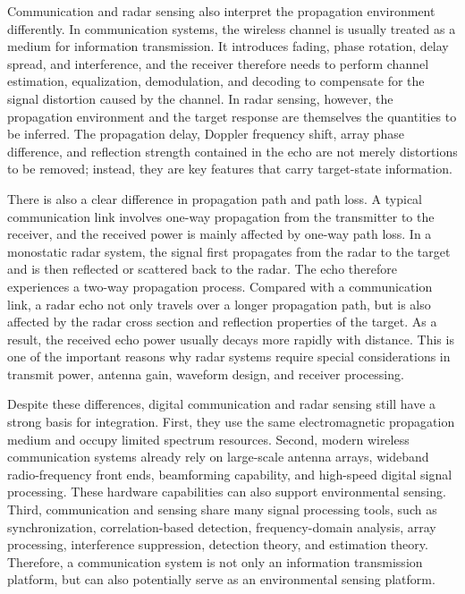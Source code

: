 Communication and radar sensing also interpret the propagation environment
differently.
In communication systems, the wireless channel is usually treated as a medium
for information transmission.
It introduces fading, phase rotation, delay spread, and interference, and the
receiver therefore needs to perform channel estimation, equalization,
demodulation, and decoding to compensate for the signal distortion caused by
the channel.
In radar sensing, however, the propagation environment and the target response
are themselves the quantities to be inferred.
The propagation delay, Doppler frequency shift, array phase difference, and
reflection strength contained in the echo are not merely distortions to be
removed; instead, they are key features that carry target-state information.

There is also a clear difference in propagation path and path loss.
A typical communication link involves one-way propagation from the transmitter
to the receiver, and the received power is mainly affected by one-way path
loss.
In a monostatic radar system, the signal first propagates from the radar to the
target and is then reflected or scattered back to the radar.
The echo therefore experiences a two-way propagation process.
Compared with a communication link, a radar echo not only travels over a longer
propagation path, but is also affected by the radar cross section and
reflection properties of the target.
As a result, the received echo power usually decays more rapidly with distance.
This is one of the important reasons why radar systems require special
considerations in transmit power, antenna gain, waveform design, and receiver
processing.

Despite these differences, digital communication and radar sensing still have
a strong basis for integration.
First, they use the same electromagnetic propagation medium and occupy limited
spectrum resources.
Second, modern wireless communication systems already rely on large-scale
antenna arrays, wideband radio-frequency front ends, beamforming capability,
and high-speed digital signal processing.
These hardware capabilities can also support environmental sensing.
Third, communication and sensing share many signal processing tools, such as
synchronization, correlation-based detection, frequency-domain analysis, array
processing, interference suppression, detection theory, and estimation theory.
Therefore, a communication system is not only an information transmission
platform, but can also potentially serve as an environmental sensing platform.

